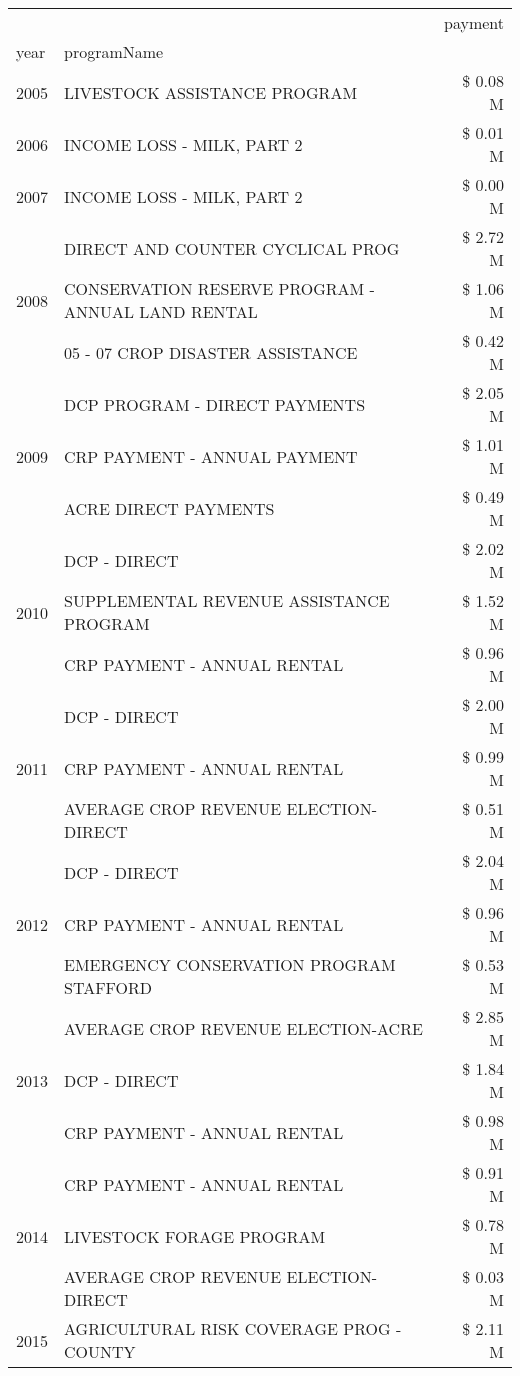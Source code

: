 \begin{tabular}{llr}
\toprule
 &  & payment \\
year & programName &  \\
\midrule
2005 & LIVESTOCK ASSISTANCE PROGRAM & \$ 0.08 M \\
\cline{1-3}
2006 & INCOME LOSS - MILK, PART 2 & \$ 0.01 M \\
\cline{1-3}
2007 & INCOME LOSS - MILK, PART 2 & \$ 0.00 M \\
\cline{1-3}
\multirow[t]{3}{*}{2008} & DIRECT AND COUNTER CYCLICAL PROG & \$ 2.72 M \\
 & CONSERVATION RESERVE PROGRAM - ANNUAL LAND RENTAL & \$ 1.06 M \\
 & 05 - 07 CROP DISASTER ASSISTANCE & \$ 0.42 M \\
\cline{1-3}
\multirow[t]{3}{*}{2009} & DCP PROGRAM - DIRECT PAYMENTS & \$ 2.05 M \\
 & CRP PAYMENT - ANNUAL PAYMENT & \$ 1.01 M \\
 & ACRE DIRECT PAYMENTS & \$ 0.49 M \\
\cline{1-3}
\multirow[t]{3}{*}{2010} & DCP - DIRECT & \$ 2.02 M \\
 & SUPPLEMENTAL REVENUE ASSISTANCE PROGRAM & \$ 1.52 M \\
 & CRP PAYMENT - ANNUAL RENTAL & \$ 0.96 M \\
\cline{1-3}
\multirow[t]{3}{*}{2011} & DCP - DIRECT & \$ 2.00 M \\
 & CRP PAYMENT - ANNUAL RENTAL & \$ 0.99 M \\
 & AVERAGE CROP REVENUE ELECTION-DIRECT & \$ 0.51 M \\
\cline{1-3}
\multirow[t]{3}{*}{2012} & DCP - DIRECT & \$ 2.04 M \\
 & CRP PAYMENT - ANNUAL RENTAL & \$ 0.96 M \\
 & EMERGENCY CONSERVATION PROGRAM STAFFORD & \$ 0.53 M \\
\cline{1-3}
\multirow[t]{3}{*}{2013} & AVERAGE CROP REVENUE ELECTION-ACRE & \$ 2.85 M \\
 & DCP - DIRECT & \$ 1.84 M \\
 & CRP PAYMENT - ANNUAL RENTAL & \$ 0.98 M \\
\cline{1-3}
\multirow[t]{3}{*}{2014} & CRP PAYMENT - ANNUAL RENTAL & \$ 0.91 M \\
 & LIVESTOCK FORAGE PROGRAM & \$ 0.78 M \\
 & AVERAGE CROP REVENUE ELECTION-DIRECT & \$ 0.03 M \\
\cline{1-3}
\multirow[t]{3}{*}{2015} & AGRICULTURAL RISK COVERAGE PROG - COUNTY & \$ 2.11 M \\

\end{tabular}
